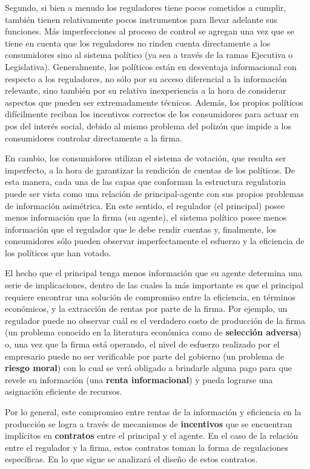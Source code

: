 \documentclass[
  12pt,
  spanish,
]{book}
\begin{document}
Segundo, si bien a menudo los reguladores tiene pocos cometidos a
cumplir, también tienen relativamente pocos instrumentos para llevar
adelante sus funciones. Más imperfecciones al proceso de control se
agregan una vez que se tiene en cuenta que los reguladores no rinden
cuenta directamente a los consumidores sino al sistema político (ya sea
a través de la ramas Ejecutiva o Legislativa). Generalmente, los
políticos están en desventaja informacional con respecto a los
reguladores, no sólo por su acceso diferencial a la información
relevante, sino también por su relativa inexperiencia a la hora de
considerar aspectos que pueden ser extremadamente técnicos. Además, los
propios políticos difícilmente reciban los incentivos correctos de los
consumidores para actuar en pos del interés social, debido al mismo
problema del polizón que impide a los consumidores controlar
directamente a la firma.

En cambio, los consumidores utilizan el sistema de votación, que resulta
ser imperfecto, a la hora de garantizar la rendición de cuentas de los
políticos. De esta manera, cada una de las capas que conforman la
estructura regulatoria puede ser vista como una relación de
principal-agente con sus propios problemas de información asimétrica. En
este sentido, el regulador (el principal) posee menos información que la
firma (su agente), el sistema político posee menos información que el
regulador que le debe rendir cuentas y, finalmente, los consumidores
sólo pueden observar imperfectamente el esfuerzo y la eficiencia de los
políticos que han votado.

El hecho que el principal tenga menos información que su agente
determina una serie de implicaciones, dentro de las cuales la más
importante es que el principal requiere encontrar una solución de
compromiso entre la eficiencia, en términos económicos, y la extracción
de rentas por parte de la firma. Por ejemplo, un regulador puede no
observar cuál es el verdadero costo de producción de la firma (un
problema conocido en la literatura económica como de \textbf{selección
adversa}) o, una vez que la firma está operando, el nivel de esfuerzo
realizado por el empresario puede no ser verificable por parte del
gobierno (un problema de \textbf{riesgo moral}) con lo cual se verá
obligado a brindarle alguna pago para que revele su información (una
\textbf{renta informacional}) y pueda lograrse una asignación eficiente
de recursos.

Por lo general, este compromiso entre rentas de la información y
eficiencia en la producción se logra a través de mecanismos de
\textbf{incentivos} que se encuentran implícitos en \textbf{contratos}
entre el principal y el agente. En el caso de la relación entre el
regulador y la firma, estos contratos toman la forma de regulaciones
específicas. En lo que sigue se analizará el diseño de estos contratos.
\end{document}
